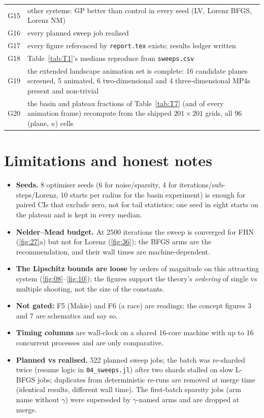 \documentclass[10pt]{article}
\begin{document}
\begin{center}
\begin{tabular}{lp{}}
G15 & other systems: GP better than control in every seed (LV, Lorenz BFGS, Lorenz NM) \\
G16 & every planned sweep job realised \\
G17 & every figure referenced by \texttt{report.tex} exists; results ledger written \\
G18 & Table~\ref{tab:T1}'s medians reproduce from \texttt{sweeps.csv} \\
G19 & the extended landscape animation set is complete: 16 candidate planes screened, 5 animated, 6 two-dimensional and 4 three-dimensional MP4s present and non-trivial \\
G20 & the basin and plateau fractions of Table~\ref{tab:T7} (and of every animation frame) recompute from the shipped $201\times201$ grids, all 96 (plane, $\kappa$) cells \\
\bottomrule
\end{tabular}
\end{center}

\section{Limitations and honest notes}
\begin{itemize}[leftmargin=1.4em, itemsep=1pt]
\item \textbf{Seeds.} 8 optimiser seeds (6 for noise/sparsity, 4 for iterations/sub-steps/Lorenz, 10 starts per radius for the basin experiment) is enough for paired CIs that exclude zero, not for tail statistics; one seed in eight starts on the plateau and is kept in every median.
\item \textbf{Nelder--Mead budget.} At 2500 iterations the sweep is converged for FHN (\ref{fig:27}a) but not for Lorenz (\ref{fig:36}); the BFGS arms are the recommendation, and their wall times are machine-dependent.
\item \textbf{The Lipschitz bounds are loose} by orders of magnitude on this attracting system (\ref{fig:08}--\ref{fig:10}); the figures support the theory's \emph{ordering} of single vs multiple shooting, not the size of the constants.
\item \textbf{Not gated:} F5 (Makie) and F6 (a race) are readings; the concept figures 3 and 7 are schematics and say so.
\item \textbf{Timing columns} are wall-clock on a shared 16-core machine with up to 16 concurrent processes and are only comparative.
\item \textbf{Planned vs realised.} 522 planned sweep jobs; the batch was re-sharded twice (resume logic in \texttt{04\_sweeps.jl}) after two shards stalled on slow L-BFGS jobs; duplicates from deterministic re-runs are removed at merge time (identical results, different wall time). The first-batch sparsity jobs (arm name without $\gamma$) were superseded by $\gamma$-named arms and are dropped at merge.
\end{itemize}
\end{document}
